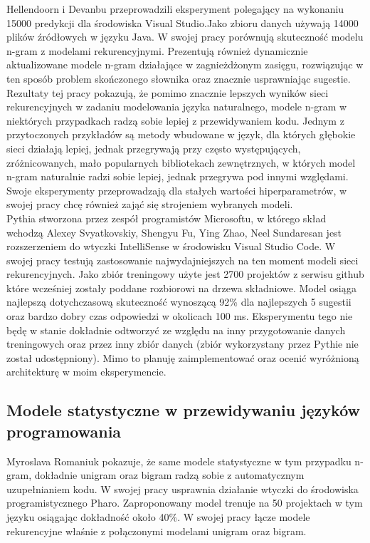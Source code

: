 Hellendoorn i Devanbu przeprowadzili eksperyment polegający na wykonaniu 15000 predykcji dla 
środowiska Visual Studio.Jako zbioru danych używają 14000 plików źródłowych w języku Java. 
W swojej pracy porównują skuteczność modelu n-gram z modelami rekurencyjnymi. 
Prezentują również dynamicznie aktualizowane modele n-gram działające w zagnieżdżonym zasięgu, rozwiązując 
w ten sposób problem skończonego słownika oraz znacznie usprawniając sugestie. Rezultaty tej pracy 
pokazują, że pomimo znacznie lepszych wyników sieci rekurencyjnych w zadaniu modelowania języka 
naturalnego, modele n-gram w niektórych przypadkach radzą sobie lepiej z przewidywaniem kodu. Jednym
z przytoczonych przykładów są metody wbudowane w język, dla których głębokie sieci działają lepiej, 
jednak przegrywają przy często występujących, zróżnicowanych,  mało popularnych bibliotekach zewnętrznych, 
w których model n-gram naturalnie radzi sobie lepiej, jednak przegrywa pod innymi względami. Swoje 
eksperymenty przeprowadzają dla stałych wartości hiperparametrów, w swojej pracy chcę również
zająć się strojeniem wybranych modeli. \\

Pythia \cite{pythia} stworzona przez zespół programistów Microsoftu, w którego skład wchodzą Alexey Svyatkovskiy, Shengyu Fu, Ying Zhao, Neel Sundaresan
jest rozszerzeniem do wtyczki IntelliSense w środowisku Visual Studio Code. W swojej pracy testują zastosowanie najwydajniejszych 
na ten moment modeli sieci rekurencyjnych. Jako zbiór treningowy użyte jest 2700 projektów z serwisu github \cite{github}
które wcześniej zostały poddane rozbiorowi na drzewa składniowe. Model osiąga najlepszą dotychczasową skuteczność wynoszącą
92\% dla najlepszych 5 sugestii oraz bardzo dobry czas odpowiedzi w okolicach 100 ms. Eksperymentu tego nie będę w stanie 
dokładnie odtworzyć ze względu na inny przygotowanie danych treningowych oraz przez inny zbiór danych (zbiór wykorzystany przez
Pythie nie został udostępniony). Mimo to planuję zaimplementować oraz ocenić wyróżnioną architekturę w moim eksperymencie. 

\subsection {Modele statystyczne w przewidywaniu języków programowania}
Myroslava Romaniuk \cite{pharo} pokazuje, że same modele statystyczne w tym przypadku n-gram, dokładnie 
unigram oraz bigram radzą sobie 
z automatycznym uzupełnianiem kodu. W swojej pracy usprawnia działanie wtyczki do środowiska programistycznego 
Pharo. Zaproponowany model trenuje na 50 projektach w tym języku osiągając dokładność około 40\%. 
W swojej pracy łącze modele rekurencyjne właśnie z połączonymi modelami unigram oraz bigram.

